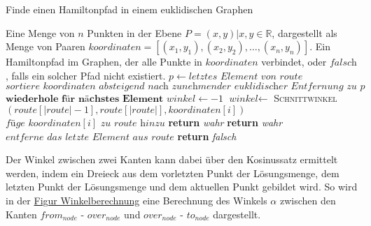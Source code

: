 \documentclass[a4paper,10pt,ngerman]{scrartcl}
\begin{document}
    \begin{algorithm}[H]
        \caption{Finde einen Hamiltonpfad in einem euklidischen Graphen}
        \begin{algorithmic}
            \Require Eine Menge von $n$ Punkten in der Ebene $P={(x,y)| x,y \in \mathbb{R}}$, dargestellt als Menge von Paaren $\textit{koordinaten}=[(x_1,y_1), (x_2,y_2),\dots, (x_n,y_n)]$.
            \Ensure Ein Hamiltonpfad im Graphen, der alle Punkte in $\textit{koordinaten}$ verbindet, oder $\textit{falsch}$, falls ein solcher Pfad nicht existiert.
                    \State $p\gets \textit{letztes Element von } \textit{route}$
                    \State $\textit{sortiere } \textit{koordinaten } \textit{absteigend nach zunehmender euklidischer Entfernung zu } p$
                \EndIf
                        \State $\textbf{wiederhole für nächstes Element}$
                    \EndIf
                    \State $\textit{winkel}\gets -1$
                        \State $\textit{winkel}\gets$ \textsc{Schnittwinkel}$(\textit{route}[|\textit{route}|-1], \textit{route}[|\textit{route}|], \textit{koordinaten}[i])$
                    \EndIf
                        \State $\textit{füge }\textit{koordinaten}[i]\textit{ zu route hinzu}$
                            \State \textbf{return} \textit{wahr}
                        \EndIf
                            \State \textbf{return} \textit{wahr}
                        \Else
                            \State $\textit{entferne das letzte Element aus route}$
                        \EndIf
                    \EndIf
                \EndFor
                \State \textbf{return} \textit{falsch}
            \EndFunction
        \end{algorithmic}\label{alg:pseudo_greedy}
    \end{algorithm}

    Der Winkel zwischen zwei Kanten kann dabei über den Kosinussatz ermittelt werden,
    indem ein Dreieck aus dem vorletzten Punkt der Lösungsmenge,
    dem letzten Punkt der Lösungsmenge und dem aktuellen Punkt gebildet wird.
    So wird in der \hyperref[fig:figure2]{Figur Winkelberechnung} eine Berechnung des Winkels $\alpha$ zwischen den Kanten
    $from_{node}$ - $over_{node}$ und $over_{node}$ - $to_{node}$ dargestellt.
\end{document}
